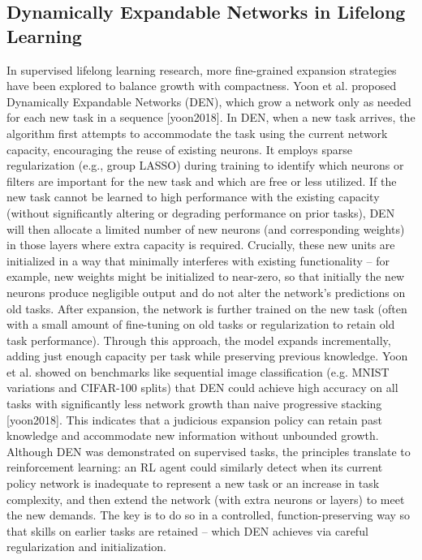 \subsection{Dynamically Expandable Networks in Lifelong Learning}
In supervised lifelong learning research, more fine-grained expansion strategies have been explored to balance growth with compactness. Yoon et al. proposed Dynamically Expandable Networks (DEN), which grow a network only as needed for each new task in a sequence [yoon2018]. In DEN, when a new task arrives, the algorithm first attempts to accommodate the task using the current network capacity, encouraging the reuse of existing neurons. It employs sparse regularization (e.g., group LASSO) during training to identify which neurons or filters are important for the new task and which are free or less utilized. If the new task cannot be learned to high performance with the existing capacity (without significantly altering or degrading performance on prior tasks), DEN will then allocate a limited number of new neurons (and corresponding weights) in those layers where extra capacity is required. Crucially, these new units are initialized in a way that minimally interferes with existing functionality – for example, new weights might be initialized to near-zero, so that initially the new neurons produce negligible output and do not alter the network’s predictions on old tasks. After expansion, the network is further trained on the new task (often with a small amount of fine-tuning on old tasks or regularization to retain old task performance). Through this approach, the model expands incrementally, adding just enough capacity per task while preserving previous knowledge. Yoon et al. showed on benchmarks like sequential image classification (e.g. MNIST variations and CIFAR-100 splits) that DEN could achieve high accuracy on all tasks with significantly less network growth than naive progressive stacking [yoon2018]. This indicates that a judicious expansion policy can retain past knowledge and accommodate new information without unbounded growth. Although DEN was demonstrated on supervised tasks, the principles translate to reinforcement learning: an RL agent could similarly detect when its current policy network is inadequate to represent a new task or an increase in task complexity, and then extend the network (with extra neurons or layers) to meet the new demands. The key is to do so in a controlled, function-preserving way so that skills on earlier tasks are retained – which DEN achieves via careful regularization and initialization.

